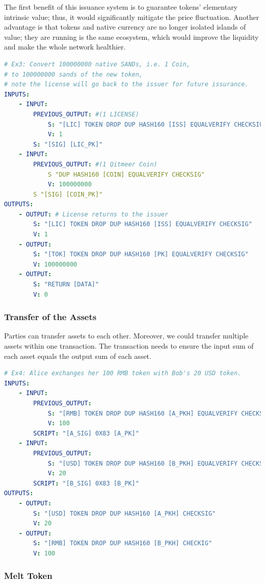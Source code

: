 \documentclass[a4paper,11pt]{article}
\begin{document}
The first benefit of this issuance system is to guarantee tokens' elementary intrinsic value; thus, it would significantly mitigate the price fluctuation. Another advantage is that tokens and native currency are no longer isolated islands of value; they are running is the same ecosystem, which would improve the liquidity and make the whole network healthier.

\lstset{basicstyle=\tiny,style=myListStyle}
\begin{lstlisting}[language=yaml, numbers=none]
# Ex3: Convert 100000000 native SANDs, i.e. 1 Coin, 
# to 100000000 sands of the new token, 
# note the license will go back to the issuer for future issurance.
INPUTS:
	- INPUT:
		PREVIOUS_OUTPUT: #(1 LICENSE)
			S: "[LIC] TOKEN DROP DUP HASH160 [ISS] EQUALVERIFY CHECKSIG"
			V: 1
		S: "[SIG] [LIC_PK]"
	- INPUT:
		PREVIOUS_OUTPUT: #(1 Qitmeer Coin)
			S "DUP HASH160 [COIN] EQUALVERIFY CHECKSIG"
			V: 100000000
		S "[SIG] [COIN_PK]"
OUTPUTS:
	- OUTPUT: # License returns to the issuer
		S: "[LIC] TOKEN DROP DUP HASH160 [ISS] EQUALVERIFY CHECKSIG"
		V: 1
	- OUTPUT:
		S: "[TOK] TOKEN DROP DUP HASH160 [PK] EQUALVERIFY CHECKSIG"
		V: 100000000
	- OUTPUT:
		S: "RETURN [DATA]"
		V: 0
\end{lstlisting}

\subsubsection{Transfer of the Assets}

Parties can transfer assets to each other. Moreover, we could transfer multiple assets within one transaction. The transaction needs to ensure the input sum of each asset equals the output sum of each asset.

\lstset{basicstyle=\tiny,style=myListStyle}
\begin{lstlisting}[language=yaml, numbers=none]
# Ex4: Alice exchanges her 100 RMB token with Bob's 20 USD token.
INPUTS:
	- INPUT:
		PREVIOUS_OUTPUT:
			S: "[RMB] TOKEN DROP DUP HASH160 [A_PKH] EQUALVERIFY CHECKSIG"
			V: 100
		SCRIPT: "[A_SIG] 0X83 [A_PK]"
	- INPUT:
		PREVIOUS_OUTPUT:
			S: "[USD] TOKEN DROP DUP HASH160 [B_PKH] EQUALVERIFY CHECKSIG"
			V: 20
		SCRIPT: "[B_SIG] 0X83 [B_PK]"
OUTPUTS:
	- OUTPUT:
		S: "[USD] TOKEN DROP DUP HASH160 [A_PKH] CHECKSIG"
		V: 20
	- OUTPUT:
		S: "[RMB] TOKEN DROP DUP HASH160 [B_PKH] CHECKIG"
		V: 100
\end{lstlisting}


\subsubsection{Melt Token}
\end{document}
